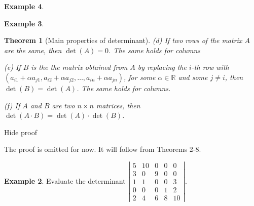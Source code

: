 \documentclass[11pt]{article}
\newtheorem{thm}{Theorem}[section]
\theoremstyle{definition}
\newtheorem{exmp}[thm]{Example}
\theoremstyle{plain}
\begin{document}
\begin{exmp}
\begin{exmp}
\begin{thm}[Main properties of determinant]
    (d) If two rows of the matrix \( A \) are the same, then \( \det(A)=0 \). The same holds for columns

    (e) If \( B \) is the the matrix obtained from \( A \) by replacing the \( i \)-th row with \( (a_{i1}+\alpha a_{j1},a_{i2}+\alpha a_{j2},\dots, a_{in}+\alpha a_{jn}) \), for some \( \alpha\in\mathbb R \) and some \( j\neq i \), then \( \det(B)=\det(A) \). The same holds for columns.

    (f) If \( A \) and \( B \) are two \( n\times n \) matrices, then \( \det(A\cdot B)=\det(A)\cdot \det(B) \).
\end{thm}
Hide proof

The proof is omitted for now. It will follow from Theorems 2-8.

\begin{exmp}
Evaluate the determinant \( \left|\begin{array}{ccccc} 5&10&0&0&0\\ 3&0&9&0&0\\ 1&1&0&0&3\\ 0&0&0&1&2\\ 2&4&6&8&10 \end{array}\right|\).
\end{exmp}


\end{exmp}
\end{exmp}
\end{document}
